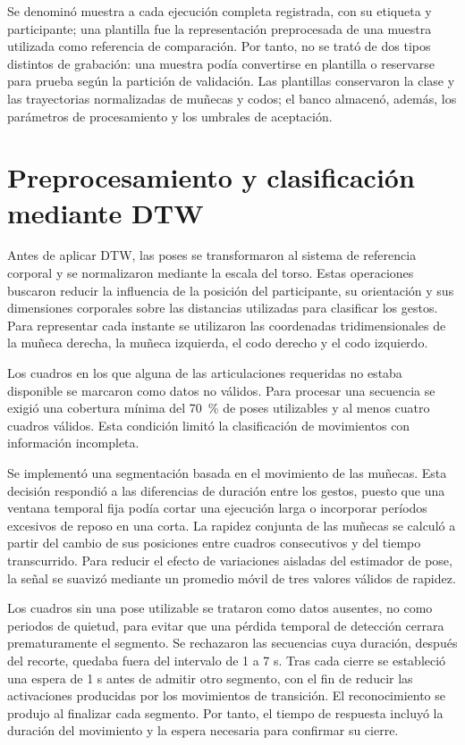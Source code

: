 Se denominó muestra a cada ejecución completa registrada, con su etiqueta y participante; una plantilla fue la representación preprocesada de una muestra utilizada como referencia de comparación. Por tanto, no se trató de dos tipos distintos de grabación: una muestra podía convertirse en plantilla o reservarse para prueba según la partición de validación. Las plantillas conservaron la clase y las trayectorias normalizadas de muñecas y codos; el banco almacenó, además, los parámetros de procesamiento y los umbrales de aceptación.

\section{Preprocesamiento y clasificación mediante DTW}

Antes de aplicar DTW, las poses se transformaron al sistema de referencia corporal y se normalizaron mediante la escala del torso. Estas operaciones buscaron reducir la influencia de la posición del participante, su orientación y sus dimensiones corporales sobre las distancias utilizadas para clasificar los gestos. Para representar cada instante se utilizaron las coordenadas tridimensionales de la muñeca derecha, la muñeca izquierda, el codo derecho y el codo izquierdo.

Los cuadros en los que alguna de las articulaciones requeridas no estaba disponible se marcaron como datos no válidos. Para procesar una secuencia se exigió una cobertura mínima del 70 \% de poses utilizables y al menos cuatro cuadros válidos. Esta condición limitó la clasificación de movimientos con información incompleta.

Se implementó una segmentación basada en el movimiento de las muñecas. Esta decisión respondió a las diferencias de duración entre los gestos, puesto que una ventana temporal fija podía cortar una ejecución larga o incorporar períodos excesivos de reposo en una corta. La rapidez conjunta de las muñecas se calculó a partir del cambio de sus posiciones entre cuadros consecutivos y del tiempo transcurrido. Para reducir el efecto de variaciones aisladas del estimador de pose, la señal se suavizó mediante un promedio móvil de tres valores válidos de rapidez.

Los cuadros sin una pose utilizable se trataron como datos ausentes, no como periodos de quietud, para evitar que una pérdida temporal de detección cerrara prematuramente el segmento. Se rechazaron las secuencias cuya duración, después del recorte, quedaba fuera del intervalo de 1 a 7 s. Tras cada cierre se estableció una espera de 1 s antes de admitir otro segmento, con el fin de reducir las activaciones producidas por los movimientos de transición. El reconocimiento se produjo al finalizar cada segmento. Por tanto, el tiempo de respuesta incluyó la duración del movimiento y la espera necesaria para confirmar su cierre.

